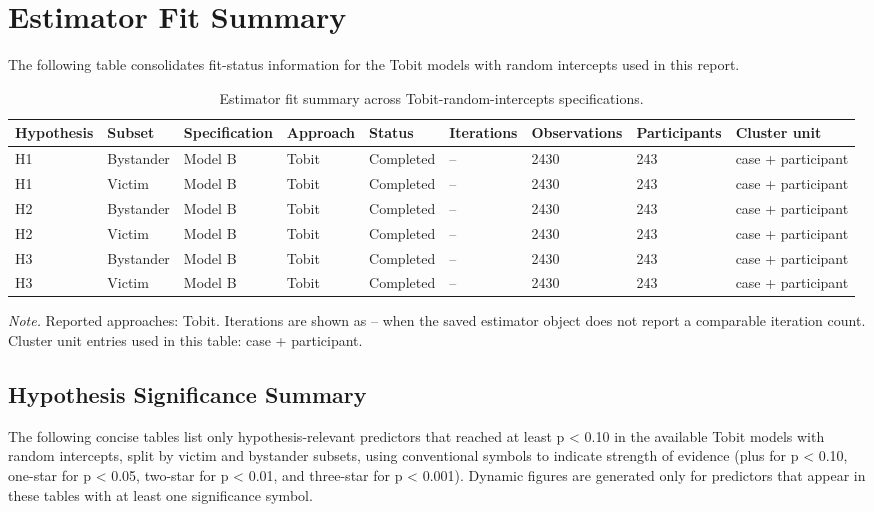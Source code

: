 \documentclass[11pt]{article}
\begin{document}
\section{Estimator Fit Summary}
The following table consolidates fit-status information for the Tobit models with random intercepts used in this report.
\begin{table}[H]
\centering
{\fontsize{11}{13}\selectfont
\renewcommand{\arraystretch}{1.10}
\caption{Estimator fit summary across Tobit-random-intercepts specifications.}
\label{tab:model_fit_summary}
\begin{tabularx}{\textwidth}{>{\raggedright\arraybackslash}Xllllllll}
\toprule
Hypothesis & Subset & Specification & Approach & Status & Iterations & Observations & Participants & Cluster unit \\
\midrule
H1 & Bystander & Model B & Tobit & Completed & -- & 2430 & 243 & case + participant \\
H1 & Victim & Model B & Tobit & Completed & -- & 2430 & 243 & case + participant \\
H2 & Bystander & Model B & Tobit & Completed & -- & 2430 & 243 & case + participant \\
H2 & Victim & Model B & Tobit & Completed & -- & 2430 & 243 & case + participant \\
H3 & Bystander & Model B & Tobit & Completed & -- & 2430 & 243 & case + participant \\
H3 & Victim & Model B & Tobit & Completed & -- & 2430 & 243 & case + participant \\
\bottomrule
\end{tabularx}
}
\end{table}
\begin{flushleft}
\footnotesize\textit{Note.} Reported approaches: Tobit. Iterations are shown as -- when the saved estimator object does not report a comparable iteration count. Cluster unit entries used in this table: case + participant.
\end{flushleft}

\subsection{Hypothesis Significance Summary}
The following concise tables list only hypothesis-relevant predictors that reached at least p < 0.10 in the available Tobit models with random intercepts, split by victim and bystander subsets, using conventional symbols to indicate strength of evidence (plus for p < 0.10, one-star for p < 0.05, two-star for p < 0.01, and three-star for p < 0.001). Dynamic figures are generated only for predictors that appear in these tables with at least one significance symbol.
\end{document}
